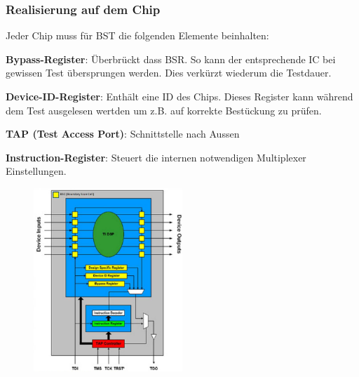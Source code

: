 \begin{multicols}{2}
    \subsubsection{Realisierung auf dem Chip}
    Jeder Chip muss für BST die folgenden Elemente beinhalten:
    \begin{compactitem}
        \item \textbf{Bypass-Register}: Überbrückt dass BSR. So kann der entsprechende IC bei gewissen Test übersprungen werden. Dies verkürzt wiederum die Testdauer.
        \item \textbf{Device-ID-Register}: Enthält eine ID des Chips. Dieses Register kann während dem Test ausgelesen wertden um z.B. auf korrekte Bestückung zu prüfen.
        \item \textbf{TAP (Test Access Port)}: Schnittstelle nach Aussen
        \item \textbf{Instruction-Register}: Steuert die internen notwendigen Multiplexer Einstellungen.
    \end{compactitem}
    \begin{figure}[H]
        \includegraphics[width=0.5\textwidth]{images/bst_aufbau.png}
    \end{figure} \ \\ \ \\
\end{multicols}

